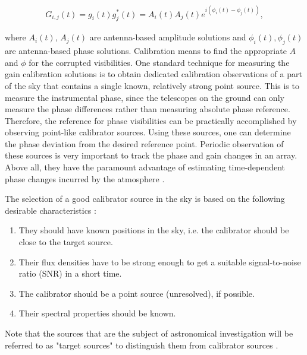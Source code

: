 \begin{align}
G_{i,j}(t)= g_i(t)g^*_j(t) = A_{i}(t)A_{j}(t) e ^{i\left(\phi_i(t)-\phi_j(t)\right)},
\label{Sols}
\end{align}

where  $A_{i}(t)$, $A_{j}(t)$ are antenna-based amplitude solutions and $\phi_i(t),\phi_j(t)$ are antenna-based phase solutions. Calibration means to find the appropriate $A$ and $\phi$ for the corrupted visibilities. One standard technique for measuring the gain calibration solutions is to obtain dedicated calibration observations of a part of the sky that contains a single known, relatively strong point source. This is to measure the instrumental phase, since the telescopes on the ground can only measure the phase differences rather than measuring absolute phase reference. Therefore, the reference for phase visibilities can be practically accomplished by observing point-like calibrator sources. Using these sources, one can determine the phase deviation from the desired reference point. Periodic observation of these sources is very important  to track the phase and gain changes in an array. Above all, they have the paramount advantage of estimating time-dependent phase changes incurred by the atmosphere \citep{taylor1999synthesis}.

The selection of a good calibrator source in the sky is based on the following desirable characteristics \citep{thompson2001interferometry}: 

\begin{enumerate}
\item They should have known positions in the sky, i.e. the calibrator should be close to the target source. 
\item  Their flux densities have to be strong enough to get a suitable signal-to-noise ratio (SNR) in a short time.
 \item The calibrator should be a point source (unresolved), if possible. 
 \item Their spectral properties should be known.
 \end{enumerate}
 
 Note that the sources that are the subject of astronomical investigation will be referred to as "target sources" to distinguish them from calibrator sources \citep{thompson2001interferometry}.
 
